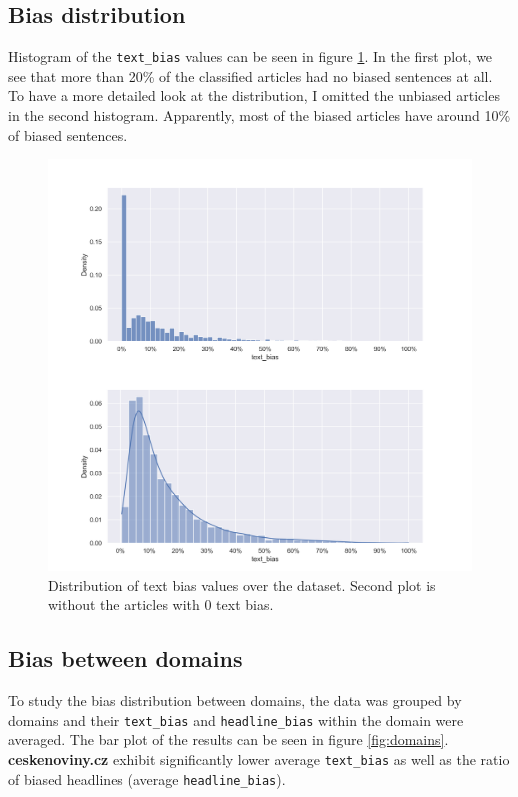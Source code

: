 \subsection{Bias distribution}
Histogram of the \verb|text_bias| values can be seen in figure \ref{fig:dists}. In the first plot, we see that more than 20\% of the classified articles had no biased sentences at all. To have a more detailed look at the distribution, I omitted the unbiased articles in the second histogram. Apparently, most of the biased articles have around 10\% of biased sentences.


\begin{figure}

  \includegraphics[scale=0.5]{my_modules/multimedia/inference/dists.jpg}
  \caption{Distribution of text bias values over the dataset. Second plot is without the articles with 0 text bias.}
  \label{fig:dists}

\end{figure}


\newpage
\subsection{Bias between domains}
To study the bias distribution between domains, the data was grouped by domains and their \verb|text_bias| and \verb|headline_bias| within the domain were averaged. The bar plot of the results can be seen in figure \ref{fig:domains}. \textbf{ceskenoviny.cz} exhibit significantly lower average \verb|text_bias| as well as the ratio of biased headlines (average \verb|headline_bias|).

